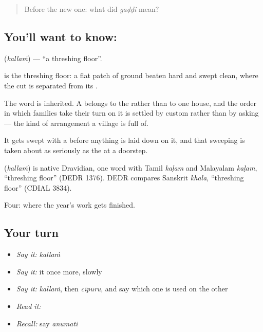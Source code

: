 \label{lesson:TE-C66-threshing-floor}



\begin{quote}
Before the new one: what did \emph{gaḍḍi} mean?
\end{quote}

\subsection*{You'll want to know: }
\textbf{} (\emph{kallaṁ}) — \textquotedblleft{}a threshing floor\textquotedblright{}.

 is the threshing floor: a flat patch of ground beaten hard and swept clean, where the cut  is separated from its .

The word is inherited. A  belongs to the  rather than to one house, and the order in which families take their turn on it is settled by custom rather than by asking — the kind of arrangement a village is full of.

It gets swept with a  before anything is laid down on it, and that sweeping is taken about as seriously as the  at a doorstep.

\begin{cousinweb}
\textbf{} (\emph{kallaṁ}) is native Dravidian, one word with Tamil \emph{kaḷam} and Malayalam \emph{kaḷam}, \textquotedblleft{}threshing floor\textquotedblright{} (DEDR 1376). DEDR compares Sanskrit \emph{khala}, \textquotedblleft{}threshing floor\textquotedblright{} (CDIAL 3834).
\end{cousinweb}

\begin{grammarlens}[title={What you've built}]
Four: where the year's work gets finished.
\end{grammarlens}

\subsection*{Your turn}
\begin{itemize}
\raggedright
  \item \emph{Say it:} \emph{kallaṁ}
  \item \emph{Say it:} it once more, slowly
  \item \emph{Say it:} \emph{kallaṁ}, then \emph{cīpuru}, and say which one is used on the other
  \item \emph{Read it:} \textbf{}
  \item \emph{Recall:} say \emph{anumati}
\end{itemize}

